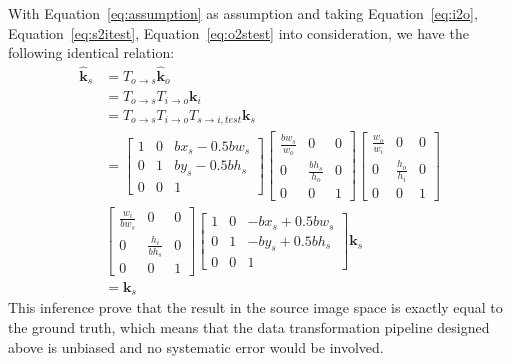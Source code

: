 \documentclass[10pt,journal,compsoc]{IEEEtran}
\begin{document}
With Equation~\ref{eq:assumption} as assumption and taking Equation~\ref{eq:i2o}, Equation~\ref{eq:s2itest}, Equation~\ref{eq:o2stest} into consideration, we have the following identical relation:
\begin{equation}
    \label{eq:inference1}
    \begin{split}
    \hat{\textbf{k}}_s  &= T_{o\rightarrow s}\hat{\textbf{k}}_o\\
                        &= T_{o\rightarrow s}T_{i\rightarrow o}\textbf{k}_i\\
                        &= T_{o\rightarrow s}T_{i\rightarrow o}T_{s\rightarrow i, test}\textbf{k}_s\\
                        &= \begin{bmatrix} 1 & 0 & bx_s-0.5bw_s \\
                    0 & 1 & by_s-0.5bh_s \\
                    0 & 0 &1 \end{bmatrix}\begin{bmatrix} \frac{bw_s}{w_o} & 0 & 0 \\
                    0 & \frac{bh_s}{h_o} & 0 \\
                    0 & 0 &1 \end{bmatrix}\begin{bmatrix} \frac{w_o}{w_i} & 0 & 0 \\
                    0 & \frac{h_o}{h_i} & 0 \\
                    0 & 0 &1 \end{bmatrix}\\
                    &\begin{bmatrix} \frac{w_i}{bw_s} & 0 & 0 \\
                    0 & \frac{h_i}{bh_s} & 0 \\
                    0 & 0 &1 \end{bmatrix}\begin{bmatrix} 1 & 0 & -bx_s+0.5bw_s \\
                    0 & 1 & -by_s+0.5bh_s \\
                    0 & 0 &1 \end{bmatrix}\textbf{k}_s\\
                        &= \textbf{k}_s
    \end{split}
\end{equation}
This inference prove that the result in the source image space is exactly equal to the ground truth, which means that the data transformation pipeline designed above is unbiased and no systematic error would be involved.
\end{document}
